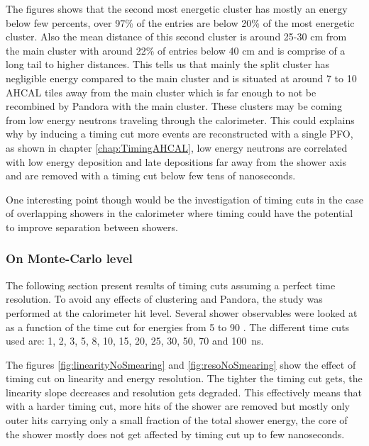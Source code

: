 The figures shows that the second most energetic cluster has mostly an energy below few percents, over 97\% of the entries are below 20\% of the most energetic cluster. Also the mean distance of this second cluster is around 25-30 cm from the main cluster with around 22\% of entries below 40 cm and is comprise of a long tail to higher distances. This tells us that mainly the split cluster has negligible energy compared to the main cluster and is situated at around 7 to 10 AHCAL tiles away from the main cluster which is far enough to not be recombined by Pandora with the main cluster. These clusters may be coming from low energy neutrons traveling through the calorimeter. This could explains why by inducing a timing cut more events are reconstructed with a single PFO, as shown in chapter \ref{chap:TimingAHCAL}, low energy neutrons are correlated with low energy deposition and late depositions far away from the shower axis and are removed with a timing cut below few tens of nanoseconds.

One interesting point though would be the investigation of timing cuts in the case of overlapping showers in the calorimeter where timing could have the potential to improve separation between showers.

\subsubsection{On Monte-Carlo level}

The following section present results of timing cuts assuming a perfect time resolution. To avoid any effects of clustering and Pandora, the study was performed at the calorimeter hit level. Several shower observables were looked at as a function of the time cut for energies from 5 \GeV to 90 \GeV \kzeroL. The different time cuts used are: 1, 2, 3, 5, 8, 10, 15, 20, 25, 30, 50, 70 and \SI{100}{\nano\second}.

The figures \ref{fig:linearityNoSmearing} and \ref{fig:resoNoSmearing} show the effect of timing cut on linearity and energy resolution. The tighter the timing cut gets, the linearity slope decreases and resolution gets degraded. This effectively means that with a harder timing cut, more hits of the shower are removed but mostly only outer hits carrying only a small fraction of the total shower energy, the core of the shower mostly does not get affected by timing cut up to few nanoseconds.

